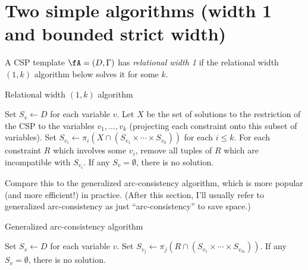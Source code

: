 \section{Two simple algorithms (width 1 and bounded strict width)}

\begin{defn} A CSP template $\fA = (D, \Gamma)$ has \emph{relational width 1} if the relational width $(1,k)$ algorithm below solves it for some $k$.
\end{defn}

\begin{algorithm}
\caption{Relational width $(1,k)$ algorithm}
\begin{algorithmic}[1]
\State Set $S_v \gets D$ for each variable $v$.
\Repeat
{}
\State Let $X$ be the set of solutions to the restriction of the CSP to the variables $v_1, ..., v_k$ (projecting each constraint onto this subset of variables).
\State Set $S_{v_i} \gets \pi_i(X \cap (S_{v_1} \times \cdots \times S_{v_k}))$ for each $i \le k$.
\State For each constraint $R$ which involves some $v_i$, remove all tuples of $R$ which are incompatible with $S_{v_i}$.
\EndFor
{}
\State If any $S_v = \emptyset$, there is no solution.
\end{algorithmic}
\end{algorithm}

Compare this to the generalized arc-consistency algorithm, which is more popular (and more efficient!) in practice. (After this section, I'll usually refer to generalized arc-consistency as just ``arc-consistency'' to save space.)

\begin{algorithm}
\caption{Generalized arc-consistency algorithm}
\begin{algorithmic}[1]
\State Set $S_v \gets D$ for each variable $v$.
\State Set $S_{v_j} \gets \pi_j (R \cap (S_{v_1} \times \cdots \times S_{v_m}))$.
\EndWhile
\State If any $S_v = \emptyset$, there is no solution.
\end{algorithmic}
\end{algorithm}

